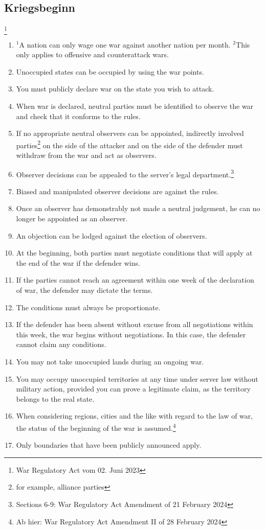 \documentclass{article}
\newcommand{\sent}[1]{$^{#1}$}
\begin{document}
\subsection{Kriegsbeginn}\footnote{War Regulatory Act vom 02. Juni 2023}
\begin{enumerate}[(1)]
	\item \sent{1}A nation can only wage one war against another nation per month. \sent{2}This only applies to offensive and counterattack wars.
	\item Unoccupied states can be occupied by using the war points.
	\item You must publicly declare war on the state you wish to attack. %
	\item When war is declared, neutral parties must be identified to observe the war and check that it conforms to the rules.
	\item If no appropriate neutral observers can be appointed, indirectly involved parties\footnote{for example, alliance parties} on the side of the attacker and on the side of the defender must withdraw from the war and act as observers.
	\item Observer decisions can be appealed to the server's legal department.\footnote{Sections 6-9: War Regulatory Act Amendment of 21 February 2024}
	\item Biased and manipulated observer decisions are against the rules.
	\item Once an observer has demonstrably not made a neutral judgement, he can no longer be appointed as an observer.
	\item An objection can be lodged against the election of observers.
	\item At the beginning, both parties must negotiate conditions that will apply at the end of the war if the defender wins. %
	\item If the parties cannot reach an agreement within one week of the declaration of war, the defender may dictate the terms.
	\item The conditions must always be proportionate.
	\item If the defender has been absent without excuse from all negotiations within this week, the war begins without negotiations. In this case, the defender cannot claim any conditions.
	\item You may not take unoccupied lands during an ongoing war.
	\item You may occupy unoccupied territories at any time under server law without military action, provided you can prove a legitimate claim, as the territory belongs to the real state.
	\item When considering regions, cities and the like with regard to the law of war, the status of the beginning of the war is assumed.\footnote{Ab hier: War Regulatory Act Amendment II of 28 February 2024}
	\item Only boundaries that have been publicly announced apply.
\end{enumerate}
\end{document}
